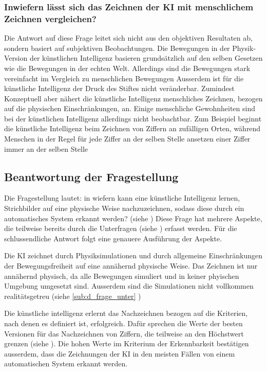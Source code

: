 \subsubsection*{Inwiefern lässt sich das Zeichnen der KI mit menschlichem Zeichnen vergleichen?}\label{subsub:d_frage_unter_6}
Die Antwort auf diese Frage leitet sich nicht aus den objektiven Resultaten ab,
sondern basiert auf subjektiven Beobachtungen. Die Bewegungen in der
Physik-Version der künstlichen Intelligenz basieren grundsätzlich auf den selben
Gesetzen wie die Bewegungen in der echten Welt. Allerdings sind die Bewegungen
stark vereinfacht im Vergleich zu menschlichen Bewegungen Ausserdem ist für die
künstliche Intelligenz der Druck des Stiftes nicht veränderbar. Zumindest
Konzeptuell aber nähert die künstliche Intelligenz menschliches Zeichnen,
bezogen auf die physischen Einschränkungen, an. Einige menschliche Gewohnheiten
sind bei der künstlichen Intelligenz allerdings nicht beobachtbar. Zum Beispiel
beginnt die künstliche Intelligenz beim Zeichnen von Ziffern an zufälligen
Orten, während Menschen in der Regel für jede Ziffer an der selben Stelle
ansetzen einer Ziffer immer an der selben Stelle


\subsection{Beantwortung der Fragestellung}\label{sub:d_frage_frag}
Die Fragestellung lautet: in wiefern kann eine künstliche Intelligenz lernen,
Strichbilder auf eine physische Weise nachzuzeichnen, sodass diese durch ein
automatisches System erkannt werden? (siehe ) Diese Frage
hat mehrere Aspekte, die teilweise bereits durch die Unterfragen (siehe
) erfasst werden. Für die schlussendliche Antwort
folgt eine genauere Ausführung der Aspekte.

Die KI zeichnet durch Physiksimulationen und durch allgemeine Einschränkungen
der Bewegungsfreiheit auf eine annähernd physische Weise. Das Zeichnen ist nur
annähernd physisch, da alle Bewegungen simuliert und in keiner phyischen
Umgebung umgesetzt sind. Ausserdem sind die Simulationen nicht vollkommen
realitätsgetreu (siehe \ref{sub:d_frage_unter} )

Die künstliche intelligenz erlernt das Nachzeichnen bezogen auf die Kriterien,
nach denen es definiert ist, erfolgreich. Dafür sprechen die Werte der besten
Versionen für das Nachzeichnen von Ziffern, die teilweise an den Höchstwert
grenzen (siehe ). Die hohen Werte im Kriterium der
Erkennbarkeit bestätigen ausserdem, dass die Zeichnungen der KI in den meisten
Fällen von einem automatischen System erkannt werden.

